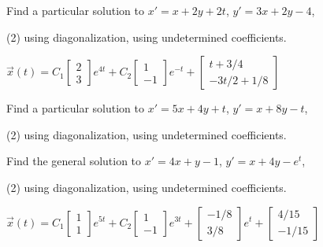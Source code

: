 \begin{exercise}
Find a particular solution to
$x' = x+ 2y +2t$, 
$y' = 3x + 2y -4$,
\begin{tasks}(2)
\task using diagonalization,
\task using undetermined coefficients.
\end{tasks}
\end{exercise}
\comboSol{%
}
{%
$\vec{x}(t) = C_1\left[\begin{smallmatrix} 2 \\ 3 \end{smallmatrix}\right]e^{4t} + C_2\left[\begin{smallmatrix} 1 \\ -1 \end{smallmatrix}\right]e^{-t} + \left[\begin{smallmatrix} t + 3/4 \\ -3t/2 + 1/8 \end{smallmatrix}\right]$
}

\begin{exercise}\ansMark%
Find a particular solution to $x' = 5x + 4y + t$, $y' = x + 8y - t$,
\begin{tasks}(2)
\task using diagonalization,
\task using undetermined coefficients.
\end{tasks}
\end{exercise}

\begin{exercise}
Find the general solution to
$x' = 4x+ y -1$, 
$y' = x + 4y -e^t$,
\begin{tasks}(2)
\task using diagonalization,
\task using undetermined coefficients.
\end{tasks}
\end{exercise}
\comboSol{%
}
{%
$\vec{x}(t) = C_1\left[\begin{smallmatrix} 1\\1 \end{smallmatrix}\right]e^{5t} + C_2\left[\begin{smallmatrix} 1 \\ -1 \end{smallmatrix}\right]e^{3t} + \left[\begin{smallmatrix} -1/8 \\ 3/8 \end{smallmatrix}\right]e^{t} + \left[\begin{smallmatrix} 4/15 \\ -1/15 \end{smallmatrix}\right]$
}

